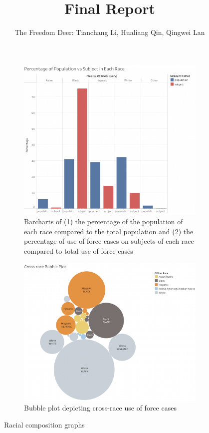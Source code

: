 \documentclass[10pt]{article}
\title{Final Report}
\author{The Freedom Deer: Tianchang Li, Hualiang Qin, Qingwei Lan}
\begin{document}
\maketitle


\begin{figure}[H]
\captionsetup{font=small}
    \begin{subfigure}{0.5\textwidth}
        \includegraphics[width=\textwidth]{img1}
        \caption{Barcharts of (1) the percentage of the population of each race compared to the total population and (2) the percentage of use of force cases on subjects of each race compared to total use of force cases}
        \label{img1}
    \end{subfigure}%
    \begin{subfigure}{0.5\textwidth}
        \includegraphics[width=\textwidth]{img3}
        \caption{Bubble plot depicting cross-race use of force cases}
        \label{img3}
    \end{subfigure}
\caption{Racial composition graphs}
\end{figure}
\end{document}
